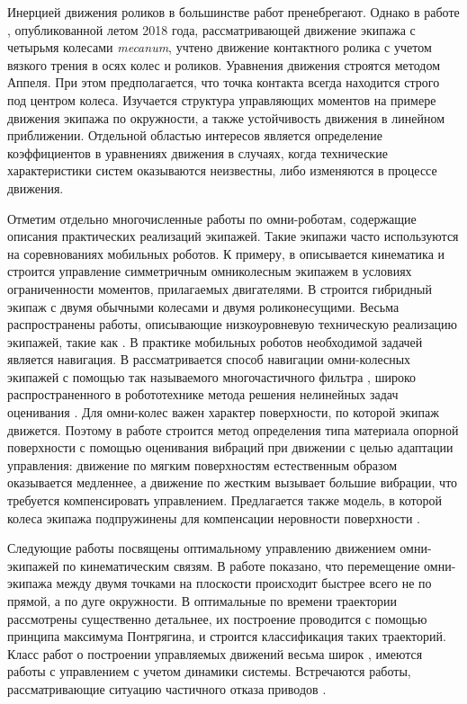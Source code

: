 Инерцией движения роликов в большинстве работ  пренебрегают. Однако в работе \cite{Adamov2018}, опубликованной летом 2018 года, рассматривающей движение экипажа с четырьмя колесами \textit{mecanum}, учтено движение контактного ролика с учетом вязкого трения в осях колес и роликов. Уравнения движения строятся методом Аппеля. При этом предполагается, что точка контакта всегда находится строго под центром колеса. Изучается структура управляющих моментов на примере движения экипажа по окружности, а также устойчивость движения в линейном приближении. Отдельной областью интересов является определение коэффициентов в уравнениях движения \cite{Adamov2018a} в случаях, когда технические характеристики систем оказываются неизвестны, либо изменяются в процессе движения.

Отметим отдельно многочисленные работы по омни-роботам, содержащие описания практических реализаций  экипажей. Такие экипажи часто используются на соревнованиях мобильных роботов. К примеру, в \cite{Indiveri2007} описывается кинематика и строится управление симметричным омниколесным экипажем в условиях ограниченности моментов, прилагаемых двигателями. В \cite{Wada2007} строится гибридный экипаж с двумя обычными колесами и двумя роликонесущими. Весьма распространены работы, описывающие  низкоуровневую техническую реализацию экипажей, такие как \cite{Mohamed2017,Krishnaraj2017,SalamAl-Ammri2010}. В практике мобильных роботов необходимой задачей является навигация. В \cite{Eng2010} рассматривается способ навигации омни-колесных экипажей с помощью так называемого многочастичного фильтра \cite{Gordon1993}, широко распространенного в робототехнике метода решения нелинейных задач оценивания \cite{DelMoral1997}. Для омни-колес важен характер поверхности, по которой экипаж движется. Поэтому в работе \cite{Vicente2015} строится метод определения типа материала опорной поверхности с помощью оценивания вибраций при движении с целью адаптации управления: движение по мягким поверхностям естественным образом оказывается медленнее, а движение по жестким вызывает б\textit{о}льшие вибрации, что требуется компенсировать управлением. Предлагается также модель, в которой колеса экипажа подпружинены для компенсации неровности поверхности \cite{NguenMAI2012}.

Следующие работы посвящены оптимальному управлению движением омни-экипажей
по кинематическим связям.
В работе \cite{Ashmore2002a} показано, что перемещение омни-экипажа между двумя точками на плоскости происходит быстрее всего не по прямой, а по дуге окружности. В \cite{Balkcom2006} оптимальные по времени траектории рассмотрены существенно детальнее, их построение проводится с помощью принципа максимума Понтрягина, и строится классификация таких траекторий. Класс работ о построении управляемых движений весьма широк \cite{Huang2015,Bramanta2017,Kalmar-Nagy2016,Szayer2017}, имеются работы с управлением с учетом динамики системы. Встречаются работы, рассматривающие ситуацию частичного отказа приводов \cite{Field2017,Ivanov2015a}.

